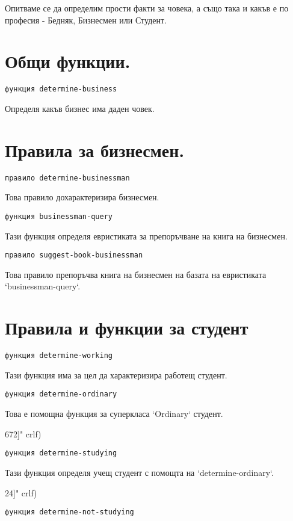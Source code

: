 \documentclass[a4paper]{article}
\begin{document}
Опитваме се да определим прости факти за човека, а също така и какъв е по
професия - Бедняк, Бизнесмен или Студент.
\section{Общи функции.}
\begin{verbatim}функция determine-business\end{verbatim}

Определя какъв бизнес има даден човек.
\section{Правила за бизнесмен.}
\begin{verbatim}правило determine-businessman\end{verbatim}

Това правило дохарактеризира бизнесмен.
\begin{verbatim}функция businessman-query\end{verbatim}

Тази функция определя евристиката за препоръчване на книга на бизнесмен.
\begin{verbatim}правило suggest-book-businessman\end{verbatim}

Това правило препоръчва книга на бизнесмен на базата на евристиката
`businessman-query`.
\section{Правила и функции за студент}
\begin{verbatim}функция determine-working\end{verbatim}

Тази функция има за цел да характеризира работещ студент.
\begin{verbatim}функция determine-ordinary\end{verbatim}

Това е помощна функция за суперкласа `Ordinary` студент.

672]" crlf)
\begin{verbatim}функция determine-studying\end{verbatim}

Тази функция определя учещ студент с помощта на `determine-ordinary`.

24]" crlf)
\begin{verbatim}функция determine-not-studying\end{verbatim}
\end{document}
